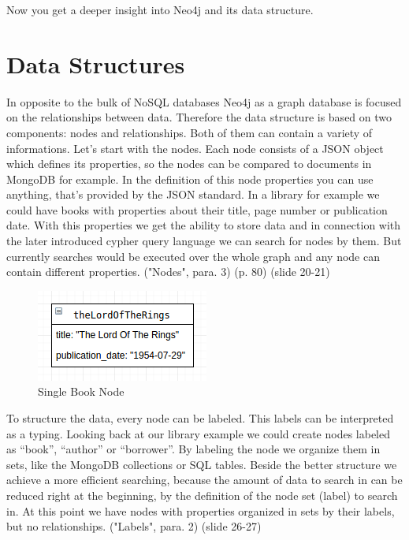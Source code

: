 Now you get a deeper insight into Neo4j and its data structure.

\section{Data Structures}

In opposite to the bulk of NoSQL databases Neo4j as a graph database is focused on the relationships between data.
Therefore the data structure is based on two components: nodes and relationships. Both of them can contain a variety of informations.
Let's start with the nodes. Each node consists of a JSON object which defines its properties, so the nodes can be compared to documents in MongoDB for example. In the definition of this node properties you can use anything, that's provided by the JSON standard. In a library for example we could have books with properties about their title, page number or publication date.
With this properties we get the ability to store data and in connection with the later introduced cypher query language we can search for nodes by them. But currently searches would be executed over the whole graph and any node can contain different properties.
\cite{NeoTechnologyInc.2017c} ("Nodes", para. 3) \cite{Gupta.2015} (p. 80) \cite{Hunger.2013} (slide 20-21)

\begin{figure}[H]
	\includegraphics[width=\linewidth,keepaspectratio]{images/neo4j/data-structure/single-node.png}
	\caption{Single Book Node}
\end{figure}

To structure the data, every node can be labeled. This labels can be interpreted as  a typing. Looking back at our library example we could create nodes labeled as “book”, “author” or “borrower”. By labeling the node we organize them in sets, like the MongoDB collections or SQL tables.
Beside the better structure we achieve a more efficient searching, because the amount of data to search in can be reduced right at the beginning, by the definition of the node set (label) to search in.
At this point we have nodes with properties organized in sets by their labels, but no relationships.
\cite{NeoTechnologyInc.2017c} ("Labels", para. 2) \cite{Hunger.2013} (slide 26-27)

